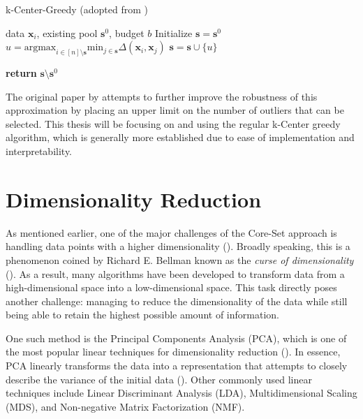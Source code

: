 \documentclass[english,bachelor,ul]{webisthesis} %
\begin{document}
\begin{algorithm}
    \caption{k-Center-Greedy (adopted from \cite{DBLP:conf/iclr/SenerS18})}%
\makeatletter{}\makeatother
\label{alg:coreset}
\begin{algorithmic}


\Require data $ \mathbf{x}_i $, existing pool $ \mathbf{s}^0 $, budget $ b $
\State Initialize $ \mathbf{s} = \mathbf{s}^0 $
\Repeat
\State $ u = \text{argmax}_{i \in [n] \setminus \mathbf{s}} \text{min}_{j \in \mathbf{s}} \Delta(\mathbf{x}_i, \mathbf{x}_j) $
\State $ \mathbf{s} = \mathbf{s} \cup \{u\} $

\State \textbf{return} $\mathbf{s} \setminus \mathbf{s}^0 $
\end{algorithmic}
\end{algorithm}

The original paper by \cite{DBLP:conf/iclr/SenerS18} attempts to further improve the robustness of this approximation by placing an upper limit on the number of outliers that can be selected. This thesis will be focusing on and using the regular k-Center greedy algorithm, which is generally more established due to ease of implementation and interpretability.

\section{Dimensionality Reduction}

As mentioned earlier, one of the major challenges of the Core-Set approach is handling data points with a higher dimensionality (\cite{DBLP:conf/iccv/SinhaED19}). Broadly speaking, this is a phenomenon coined by Richard E. Bellman known as the \textit{curse of dimensionality} (\cite{franccois2007high}). 
As a result, many algorithms have been developed to transform data from a high-dimensional space into a low-dimensional space. This task directly poses another challenge: managing to reduce the dimensionality of the data while still being able to retain the highest possible amount of information. 

One such method is the Principal Components Analysis (PCA), which is one of the most popular linear techniques for dimensionality reduction (\cite{van2009dimensionality}). In essence, PCA linearly transforms the data into a representation that attempts to closely describe the variance of the initial data (\cite{jolliffe2016principal}). Other commonly used linear techniques include Linear Discriminant Analysis (LDA), Multidimensional Scaling (MDS), and Non-negative Matrix Factorization (NMF).
\end{document}
